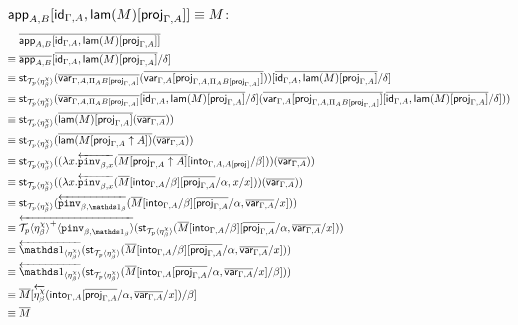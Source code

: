 \documentclass[10pt]{article}
\theoremstyle{definition}
\newcommand{\id}{\mathsf{id}}
\newcommand{\rewrite}[2]{\overleftarrow{#1}(#2)}
\newcommand\UI[2]{\ensuremath{\lambda #1.#2}}
\newcommand\StI[2]{\ensuremath{\mathsf{st}_{#1}(#2)}}
\newcommand\ApEl[2]{\mathcal{T}_{#1}\langle#2\rangle}
\newcommand\ApPlus[2]{\ensuremath{{#1}^+ \langle #2 \rangle }}
\begin{document}
\begin{enumerate}[style = multiline, labelwidth = 80pt]
\item[{$\qapp{A,B}[\id_{\Gamma, A}, \qlam(M)[\proj{\Gamma, A}]] \equiv M$}:] 
\begin{align*}
&\upstairs{\qapp{A,B}[\id_{\Gamma, A}, \qlam(M)[\proj{\Gamma, A}]]} \\
\equiv{} &\upstairs{\qapp{A,B}}[\upstairs{\id_{\Gamma, A}, \qlam(M)[\proj{\Gamma, A}]}/\delta] \\
\equiv{} &\StI{\ApEl{p}{\eta^\chi_\beta}}{\upstairs{\qvar{\Gamma, A, \Pi_A B[\proj{\Gamma, A}]}}(\upstairs{\qvar{\Gamma, A}[\proj{\Gamma, A, \Pi_A B[\proj{\Gamma, A}]}]})}[\upstairs{\id_{\Gamma, A}, \qlam(M)[\proj{\Gamma, A}]}/\delta] \\
\equiv{} &\StI{\ApEl{p}{\eta^\chi_\beta}}{\upstairs{\qvar{\Gamma, A, \Pi_A B[\proj{\Gamma, A}]}}[\upstairs{\id_{\Gamma, A}, \qlam(M)[\proj{\Gamma, A}]}/\delta](\upstairs{\qvar{\Gamma, A}[\proj{\Gamma, A, \Pi_A B[\proj{\Gamma, A}]}]}[\upstairs{\id_{\Gamma, A}, \qlam(M)[\proj{\Gamma, A}]}/\delta])} \\
\equiv{} &\StI{\ApEl{p}{\eta^\chi_\beta}}{\upstairs{\qlam(M)[\proj{\Gamma, A}]}(\upstairs{\qvar{\Gamma, A}})} \\
\equiv{} &\StI{\ApEl{p}{\eta^\chi_\beta}}{\upstairs{\qlam(M[\proj{\Gamma, A} \uparrow A])}(\upstairs{\qvar{\Gamma, A}})} \\
\equiv{} &\StI{\ApEl{p}{\eta^\chi_\beta}}{(\UI{x}{\rewrite{\pinv{\beta,x}}{\upstairs{M[\proj{\Gamma, A} \uparrow A]}[\into{\Gamma, A, A[\proj{}]}/\beta]}})(\upstairs{\qvar{\Gamma, A}})} \\
\equiv{} &\StI{\ApEl{p}{\eta^\chi_\beta}}{(\UI{x}{\rewrite{\pinv{\beta,x}}{\upstairs{M}[\into{\Gamma, A}/\beta][\upstairs{\proj{\Gamma, A}}/\alpha, x/x]}})(\upstairs{\qvar{\Gamma, A}})} \\
\equiv{} &\StI{\ApEl{p}{\eta^\chi_\beta}}{\rewrite{\pinv{\beta,\One_\beta}}{\upstairs{M}[\into{\Gamma, A}/\beta][\upstairs{\proj{\Gamma, A}}/\alpha, \upstairs{\qvar{\Gamma, A}}/x]}} \\
\equiv{} &\rewrite{\ApPlus{\ApEl{p}{\eta^\chi_\beta}}{\pinv{\beta,\One_\beta}}}{\StI{\ApEl{p}{\eta^\chi_\beta}}{\upstairs{M}[\into{\Gamma, A}/\beta][\upstairs{\proj{\Gamma, A}}/\alpha, \upstairs{\qvar{\Gamma, A}}/x]}} \\
\equiv{} &\rewrite{\ApOne{\eta^\chi_\beta}}{\StI{\ApEl{p}{\eta^\chi_\beta}}{\upstairs{M}[\into{\Gamma, A}/\beta][\upstairs{\proj{\Gamma, A}}/\alpha, \upstairs{\qvar{\Gamma, A}}/x]}} \\
\equiv{} &\rewrite{\ApOne{\eta^\chi_\beta}}{\StI{\ApEl{p}{\eta^\chi_\beta}}{\upstairs{M}[\into{\Gamma, A}[\upstairs{\proj{\Gamma, A}}/\alpha, \upstairs{\qvar{\Gamma, A}}/x]/\beta]}} \\
\equiv{} &\upstairs{M}[\rewrite{\eta^\chi_\beta}{\into{\Gamma, A}[\upstairs{\proj{\Gamma, A}}/\alpha, \upstairs{\qvar{\Gamma, A}}/x]}/\beta] \\
\equiv{} &\upstairs{M}
\end{align*} 


\end{enumerate}
\end{document}

